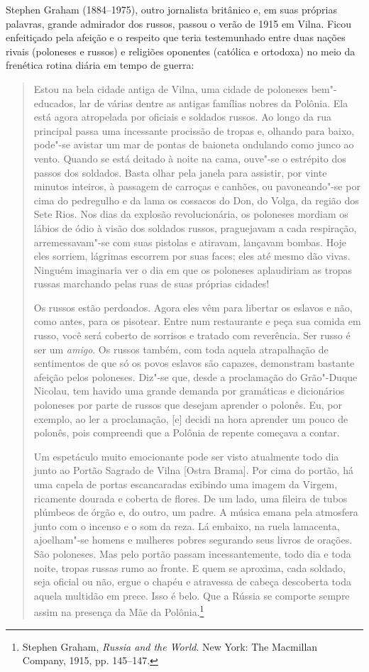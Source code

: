 Stephen Graham (1884--1975), outro jornalista britânico e, em suas
próprias palavras, grande admirador dos russos, passou o verão de 1915
em Vilna. Ficou enfeitiçado pela afeição e o respeito que teria
testemunhado entre duas nações rivais (poloneses e russos) e religiões
oponentes (católica e ortodoxa) no meio da frenética rotina diária em
tempo de guerra:

\begin{quote}
Estou na bela cidade antiga de Vilna, uma cidade de poloneses
bem"-educados, lar de várias dentre as antigas famílias nobres da
Polônia. Ela está agora atropelada por oficiais e soldados russos. Ao
longo da rua principal passa uma incessante procissão de tropas e,
olhando para baixo, pode"-se avistar um mar de pontas de baioneta
ondulando como junco ao vento. Quando se está deitado à noite na cama,
ouve"-se o estrépito dos passos dos soldados. Basta olhar pela janela
para assistir, por vinte minutos inteiros, à passagem de carroças e
canhões, ou pavoneando"-se por cima do pedregulho e da lama os cossacos
do Don, do Volga, da região dos Sete Rios. Nos dias da explosão
revolucionária, os poloneses mordiam os lábios de ódio à visão dos
soldados russos, praguejavam a cada respiração, arremessavam"-se com suas
pistolas e atiravam, lançavam bombas. Hoje eles sorriem, lágrimas
escorrem por suas faces; eles até mesmo dão vivas. Ninguém imaginaria
ver o dia em que os poloneses aplaudiriam as tropas russas marchando
pelas ruas de suas próprias cidades!

Os russos estão perdoados. Agora eles vêm para libertar os eslavos e
não, como antes, para os pisotear. Entre num restaurante e peça sua
comida em russo, você será coberto de sorrisos e tratado com reverência.
Ser russo é ser um \emph{amigo}. Os russos também, com toda aquela
atrapalhação de sentimentos de que só os povos eslavos são capazes,
demonstram bastante afeição pelos poloneses. Diz"-se que, desde a
proclamação do Grão"-Duque Nicolau, tem havido uma grande demanda por
gramáticas e dicionários poloneses por parte de russos que desejam
aprender o polonês. Eu, por exemplo, ao ler a proclamação, {[}e{]}
decidi na hora aprender um pouco de polonês, pois compreendi que a
Polônia de repente começava a contar.

Um espetáculo muito emocionante pode ser visto atualmente todo dia junto
ao Portão Sagrado de Vilna {[}Ostra Brama{]}. Por cima do portão, há uma
capela de portas escancaradas exibindo uma imagem da Virgem, ricamente
dourada e coberta de flores. De um lado, uma fileira de tubos plúmbeos
de órgão e, do outro, um padre. A música emana pela atmosfera junto com
o incenso e o som da reza. Lá embaixo, na ruela lamacenta, ajoelham"-se
homens e mulheres pobres segurando seus livros de orações. São
poloneses. Mas pelo portão passam incessantemente, todo dia e toda
noite, tropas russas rumo ao fronte. E quem se aproxima, cada soldado,
seja oficial ou não, ergue o chapéu e atravessa de cabeça descoberta
toda aquela multidão em prece. Isso é belo. Que a Rússia se comporte
sempre assim na presença da Mãe da Polônia.\footnote{Stephen Graham,
  \emph{Russia and the World}. New York: The Macmillan Company, 1915,
  pp. 145--147.}
\end{quote}


